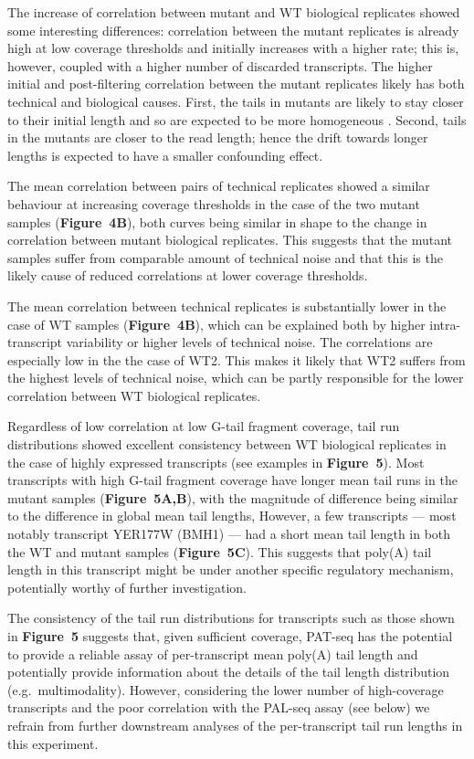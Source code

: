 \documentclass[10pt]{article}
\begin{document}
The increase of correlation between mutant and WT biological replicates showed some interesting differences: correlation between the mutant replicates is already high at low coverage thresholds and initially increases with a higher rate; this is, however, coupled with a higher number of discarded transcripts. The higher initial and post-filtering correlation between the mutant replicates likely has both technical and biological causes. First, the tails in mutants are likely to stay closer to their initial length and so are expected to be more homogeneous \cite{traven05,beilharz07}. Second, tails in the mutants are closer to the read length; hence the drift towards longer lengths is expected to have a smaller confounding effect.

The mean correlation between pairs of technical replicates showed a similar behaviour at increasing coverage thresholds in the case of the two mutant samples (\textbf{Figure~4B}), both curves being similar in shape to the change in correlation between mutant biological replicates. This suggests that the mutant samples suffer from comparable amount of technical noise and that this is the likely cause of reduced correlations at lower coverage thresholds.

The mean correlation between technical replicates is substantially lower in the case of WT samples (\textbf{Figure~4B}), which can be explained both by higher intra-transcript variability or higher levels of technical noise. The correlations are especially low in the the case of WT2. This makes it likely that WT2 suffers from the highest levels of technical noise, which can be partly responsible for the lower correlation between WT biological replicates.

Regardless of low correlation at low G-tail fragment coverage, tail run distributions showed excellent consistency between WT biological replicates in the case of highly expressed transcripts (see examples in \textbf{Figure~5}). Most transcripts with high G-tail fragment coverage have longer mean tail runs in the mutant samples (\textbf{Figure~5A,B}), with the magnitude of difference being similar to the difference in global mean tail lengths, However, a few transcripts --- most notably transcript YER177W (BMH1) --- had a short mean tail length in both the WT and mutant samples (\textbf{Figure~5C}). This suggests that poly(A) tail length in this transcript might be under another specific regulatory mechanism, potentially worthy of further investigation.

The consistency of the tail run distributions for transcripts such as those shown in \textbf{Figure~5} suggests that, given sufficient coverage, PAT-seq has the potential to provide a reliable assay of per-transcript mean poly(A) tail length and potentially provide information about the details of the tail length distribution (e.g.~multimodality). However, considering the lower number of high-coverage transcripts and the poor correlation with the PAL-seq assay (see below) we refrain from further downstream analyses of the per-transcript tail run lengths in this experiment.
\end{document}

